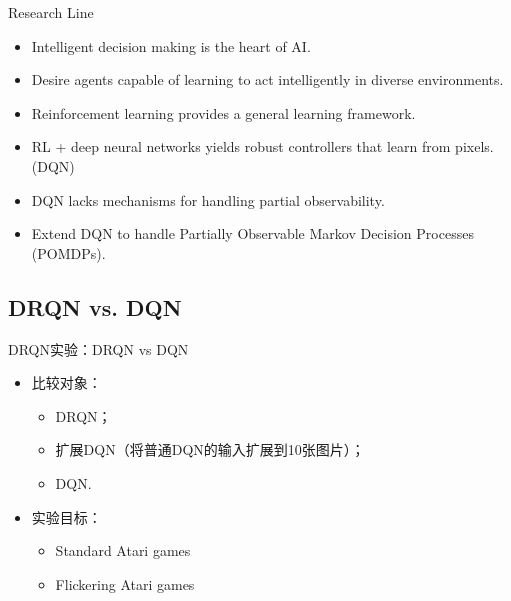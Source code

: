 \documentclass[10pt]{beamer}
\begin{document}
	\begin{frame}{Research Line}
		\begin{itemize}
			\item Intelligent decision making is the heart of AI.
			
			\item Desire agents capable of learning to act intelligently in diverse environments.
			
			\item Reinforcement learning provides a general learning framework.
			
			\item RL + deep neural networks yields robust controllers that learn from pixels. (DQN)
			
			\item DQN lacks mechanisms for handling partial observability.
			
			\item Extend DQN to handle Partially Observable Markov Decision Processes (POMDPs).
			
		\end{itemize}
	\end{frame}

	\subsection{DRQN vs. DQN}

	\begin{frame}{DRQN}{实验：DRQN vs DQN}
		\begin{itemize}
			\item<2-> 比较对象：
				\begin{itemize}
					\item DRQN；
					\item 扩展DQN（将普通DQN的输入扩展到10张图片）；
					\item DQN.
				\end{itemize}
			
			\item<3-> 实验目标：
				\begin{itemize}
					\item Standard Atari games
					\item Flickering Atari games
				\end{itemize}
			
		\end{itemize}
	\end{frame}
\end{document}
